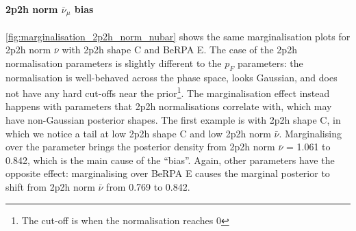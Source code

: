 \paragraph{2p2h norm $\bar{\nu}_\mu$ bias}
\autoref{fig:marginalisation_2p2h_norm_nubar} shows the same marginalisation plots for 2p2h norm $\bar{\nu}$ with 2p2h shape C and BeRPA E. The case of the 2p2h normalisation parameters is slightly different to the $p_F$ parameters: the normalisation is well-behaved across the phase space, looks Gaussian, and does not have any hard cut-offs near the prior\footnote{The cut-off is when the normalisation reaches 0}. The marginalisation effect instead happens with parameters that 2p2h normalisations correlate with, which may have non-Gaussian posterior shapes. The first example is with 2p2h shape C, in which we notice a tail at low 2p2h shape C and low 2p2h norm $\bar{\nu}$. Marginalising over the parameter brings the posterior density from 2p2h norm $\bar{\nu}$ = 1.061 to 0.842, which is the main cause of the ``bias''. Again, other parameters have the opposite effect: marginalising over BeRPA E causes the marginal posterior to shift from 2p2h norm $\bar{\nu}$ from 0.769 to 0.842.
